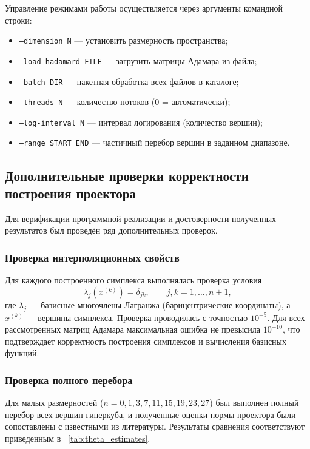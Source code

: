 \documentclass[a4paper,12pt]{article}
\theoremstyle{indented}
\begin{document}
Управление режимами работы осуществляется через аргументы командной строки:
\begin{itemize}
    \item \texttt{--dimension N} — установить размерность пространства;
    \item \texttt{--load-hadamard FILE} — загрузить матрицы Адамара из файла;
    \item \texttt{--batch DIR} — пакетная обработка всех файлов в каталоге;
    \item \texttt{--threads N} — количество потоков (0 = автоматически);
    \item \texttt{--log-interval N} — интервал логирования (количество вершин);
    \item \texttt{--range START END} — частичный перебор вершин в заданном диапазоне.
\end{itemize}


\subsection{Дополнительные проверки корректности построения проектора}

Для верификации программной реализации и достоверности полученных результатов был проведён ряд дополнительных проверок.

\subsubsection{Проверка интерполяционных свойств}

Для каждого построенного симплекса выполнялась проверка условия
\[
\lambda_j(x^{(k)}) = \delta_{jk}, \qquad j,k = 1,\dots,n+1,
\]
где $\lambda_j$ — базисные многочлены Лагранжа (барицентрические координаты), а $x^{(k)}$ — вершины симплекса. Проверка проводилась с точностью $10^{-5}$. Для всех рассмотренных матриц Адамара максимальная ошибка не превысила $10^{-10}$, что подтверждает корректность построения симплексов и вычисления базисных функций.

\subsubsection{Проверка полного перебора}

Для малых размерностей ($n = 0, 1, 3, 7, 11, 15, 19, 23, 27$) был выполнен полный перебор всех вершин гиперкуба, и полученные оценки нормы проектора были сопоставлены с известными из литературы. Результаты сравнения соответствуют приведенным в ~\ref{tab:theta_estimates}.
\end{document}

